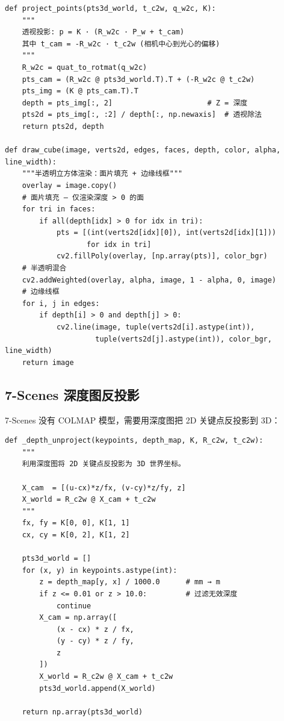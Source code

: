 \documentclass[12pt,a4paper]{ctexart}
\begin{document}
\begin{lstlisting}[style=pythonstyle, caption={透视投影与立方体渲染}]
def project_points(pts3d_world, t_c2w, q_w2c, K):
    """
    透视投影: p = K · (R_w2c · P_w + t_cam)
    其中 t_cam = -R_w2c · t_c2w (相机中心到光心的偏移)
    """
    R_w2c = quat_to_rotmat(q_w2c)
    pts_cam = (R_w2c @ pts3d_world.T).T + (-R_w2c @ t_c2w)
    pts_img = (K @ pts_cam.T).T
    depth = pts_img[:, 2]                      # Z = 深度
    pts2d = pts_img[:, :2] / depth[:, np.newaxis]  # 透视除法
    return pts2d, depth

def draw_cube(image, verts2d, edges, faces, depth, color, alpha, line_width):
    """半透明立方体渲染：面片填充 + 边缘线框"""
    overlay = image.copy()
    # 面片填充 — 仅渲染深度 > 0 的面
    for tri in faces:
        if all(depth[idx] > 0 for idx in tri):
            pts = [(int(verts2d[idx][0]), int(verts2d[idx][1]))
                   for idx in tri]
            cv2.fillPoly(overlay, [np.array(pts)], color_bgr)
    # 半透明混合
    cv2.addWeighted(overlay, alpha, image, 1 - alpha, 0, image)
    # 边缘线框
    for i, j in edges:
        if depth[i] > 0 and depth[j] > 0:
            cv2.line(image, tuple(verts2d[i].astype(int)),
                     tuple(verts2d[j].astype(int)), color_bgr, line_width)
    return image
\end{lstlisting}

\subsection{7-Scenes 深度图反投影}

7-Scenes 没有 COLMAP 模型，需要用深度图把 2D 关键点反投影到 3D：

\begin{lstlisting}[style=pythonstyle, caption={深度图反投影: 2D → 3D}]
def _depth_unproject(keypoints, depth_map, K, R_c2w, t_c2w):
    """
    利用深度图将 2D 关键点反投影为 3D 世界坐标。

    X_cam  = [(u-cx)*z/fx, (v-cy)*z/fy, z]
    X_world = R_c2w @ X_cam + t_c2w
    """
    fx, fy = K[0, 0], K[1, 1]
    cx, cy = K[0, 2], K[1, 2]

    pts3d_world = []
    for (x, y) in keypoints.astype(int):
        z = depth_map[y, x] / 1000.0      # mm → m
        if z <= 0.01 or z > 10.0:         # 过滤无效深度
            continue
        X_cam = np.array([
            (x - cx) * z / fx,
            (y - cy) * z / fy,
            z
        ])
        X_world = R_c2w @ X_cam + t_c2w
        pts3d_world.append(X_world)

    return np.array(pts3d_world)
\end{lstlisting}
\end{document}
